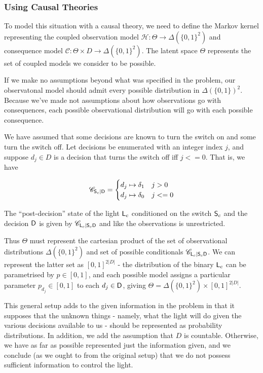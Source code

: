 \subsubsection{Using Causal Theories}

To model this situation with a causal theory, we need to define the Markov kernel representing the coupled observation model $\mathscr{H}:\Theta\to \Delta(\{0,1\}^2)$ and consequence model $\mathscr{C}:\Theta\times D\to \Delta(\{0,1\}^2)$. The latent space $\Theta$ represents the set of coupled models we consider to be possible.

If we make no assumptions beyond what was specified in the problem, our observatonal model should admit every possible distribution in $\Delta(\{0,1\})^2$. Because we've made not assumptions about how observations go with consequences, each possible observational distribution will go with each possible consequence.

We have assumed that some decisions are known to turn the switch on and some turn the switch off. Let decisions be enumerated with an integer index $j$, and suppose $d_j\in D$ is a decision that turns the switch off iff $j<=0$. That is, we have

\begin{align}
\mathscr{C}_{\mathsf{S}_c|\mathsf{D}} = \begin{cases}
d_j \mapsto \delta_1 & j>0\\
d_j \mapsto \delta_0 & j<=0
\end{cases}
\end{align}

The ``post-decision'' state of the light $\mathsf{L}_c$ conditioned on the switch $\mathsf{S}_c$ and the decision $\mathsf{D}$ is given by $\mathscr{C}_{\mathsf{L}_c|\mathsf{S}_c\mathsf{D}}$ and like the observations is unrestricted. 

Thus $\Theta$ must represent the cartesian product of the set of observational distributions $\Delta(\{0,1\}^2)$ and set of possible conditionals $\mathscr{C}_{\mathsf{L}_c|\mathsf{S}_c\mathsf{D}}$. We can represent the latter set as $[0,1]^{2|D|}$ - the distribution of the binary $\mathsf{L}_c$ can be parametrised by $p\in [0,1]$, and each possible model assigns a particular parameter $p_{d_j}\in [0,1]$ to each $d_j\in \mathsf{D}$, giving $\Theta = \Delta(\{0,1\}^2)\times [0,1]^{2|D|}$.

This general setup adds to the given information in the problem in that it supposes that the unknown things - namely, what the light will do given the various decisions available to us - should be represented as probability distributions. In addition, we add the assumption that $D$ is countable. Otherwise, we have as far as possible represented just the information given, and we conclude (as we ought to from the original setup) that we do not possess sufficient information to control the light.

